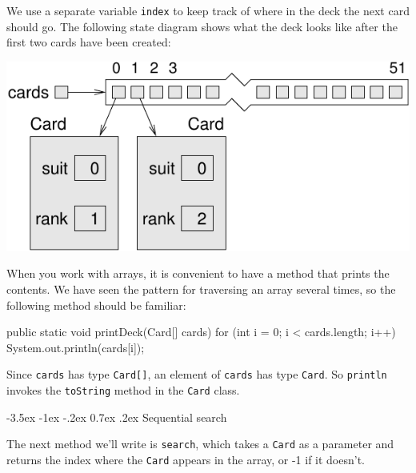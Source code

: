 \documentclass[12pt]{book}
\makeatletter
\theoremstyle{exercise}
\newcommand{\java}[1]{\verb"#1"}
\renewcommand{\section}{\@startsection{section}{1}{\z@}%
    {-3.5ex \@plus -1ex \@minus -.2ex}%
    {0.7ex \@plus.2ex}%
    {\normalfont\Large\bfseries}}
\newcommand{\java}[1]{\lstinline{#1}} %
\makeatother
\begin{document}

We use a separate variable \java{index} to keep track of where in the deck the next card should go.
The following state diagram shows what the deck looks like after the first two cards have been created:


\begin{center}
\includegraphics{figs/cardarray2.pdf}
\end{center}


When you work with arrays, it is convenient to have a method that prints the contents.
We have seen the pattern for traversing an array several times, so the following method should be familiar:

\begin{code}
    public static void printDeck(Card[] cards) {
        for (int i = 0; i < cards.length; i++) {
            System.out.println(cards[i]);
        }
    }
\end{code}

Since \java{cards} has type \java{Card[]}, an element of \java{cards} has type \java{Card}.
So \java{println} invokes the \java{toString} method in the \java{Card} class.


\section{Sequential search}
\label{findcard}


The next method we'll write is \java{search}, which takes a \java{Card} as a parameter and returns the index where the \java{Card} appears in the array, or -1 if it doesn't.

\end{document}
